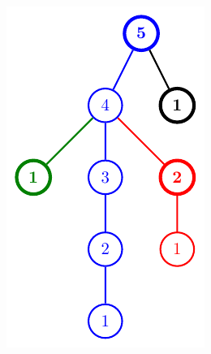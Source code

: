 \begin{frame}
\begin{columns}
    \includegraphics[width=\linewidth]{solution-figure.pdf}
  \end{columns}

  \solvestats
\end{frame}
